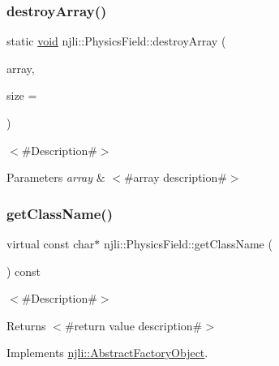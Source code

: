 \subsubsection{\texorpdfstring{destroy\+Array()}{destroyArray()}}
{\footnotesize\ttfamily static \mbox{\hyperlink{_thread_8h_af1e856da2e658414cb2456cb6f7ebc66}{void}} njli\+::\+Physics\+Field\+::destroy\+Array (\begin{DoxyParamCaption}\item[{\mbox{\hyperlink{classnjli_1_1_physics_field}{Physics\+Field}} $\ast$$\ast$}]{array,  }\item[{const \mbox{\hyperlink{_util_8h_a10e94b422ef0c20dcdec20d31a1f5049}{u32}}}]{size = {} }\end{DoxyParamCaption})\hspace{0.3cm}{\ttfamily [static]}}

$<$\#\+Description\#$>$


\begin{DoxyParams}{Parameters}
{\em array} & $<$\#array description\#$>$ \\
\hline
\end{DoxyParams}
\mbox{\label{classnjli_1_1_physics_field_ad9c54dfbb4fdd414c3862c9f26566b71}} 
\subsubsection{\texorpdfstring{get\+Class\+Name()}{getClassName()}}
{\footnotesize\ttfamily virtual const char$\ast$ njli\+::\+Physics\+Field\+::get\+Class\+Name (\begin{DoxyParamCaption}{ }\end{DoxyParamCaption}) const\hspace{0.3cm}{\ttfamily [virtual]}}

$<$\#\+Description\#$>$

\begin{DoxyReturn}{Returns}
$<$\#return value description\#$>$ 
\end{DoxyReturn}


Implements \mbox{\hyperlink{classnjli_1_1_abstract_factory_object_af4151e41b80d5bc3fc42822c67fc2278}{njli\+::\+Abstract\+Factory\+Object}}.

\mbox{\label{classnjli_1_1_physics_field_ad41266885be835f3ee602311e20877a4}} 

